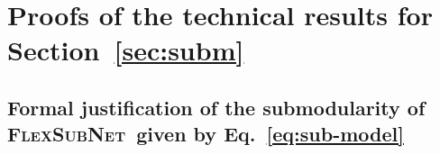 \documentclass{article}
\newcommand{\our}{\textsc{Flex\-Sub\-Net}}
\newcommand{\xhdr}[1]{\noindent\textbf{#1.}}
\renewcommand{\cite}{\citep}
\begin{document}


 
\section{Proofs of the technical results for Section~\ref{sec:subm}}
\label{app:sec:alpha}

\subsection{Formal justification of the submodularity of \our\ given by Eq.~\eqref{eq:sub-model}}
\end{document}
